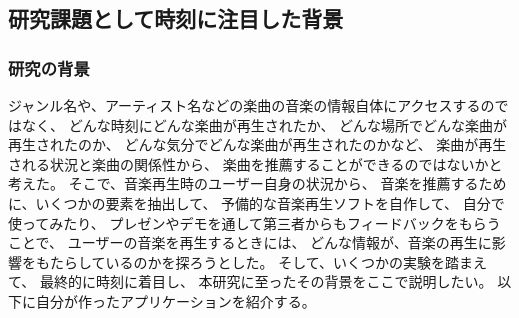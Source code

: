 \documentclass[11pt, onecolumn]{jsarticle}
\begin{document}
\subsection{研究課題として時刻に注目した背景}
\subsubsection{研究の背景}
ジャンル名や、アーティスト名などの楽曲の音楽の情報自体にアクセスするのではなく、
どんな時刻にどんな楽曲が再生されたか、
どんな場所でどんな楽曲が再生されたのか、
どんな気分でどんな楽曲が再生されたのかなど、
楽曲が再生される状況と楽曲の関係性から、
楽曲を推薦することができるのではないかと考えた。
そこで、音楽再生時のユーザー自身の状況から、
音楽を推薦するために、いくつかの要素を抽出して、
予備的な音楽再生ソフトを自作して、
自分で使ってみたり、
プレゼンやデモを通して第三者からもフィードバックをもらうことで、
ユーザーの音楽を再生するときには、
どんな情報が、音楽の再生に影響をもたらしているのかを探ろうとした。
そして、いくつかの実験を踏まえて、
最終的に時刻に着目し、
本研究に至ったその背景をここで説明したい。
以下に自分が作ったアプリケーションを紹介する。
\end{document}
